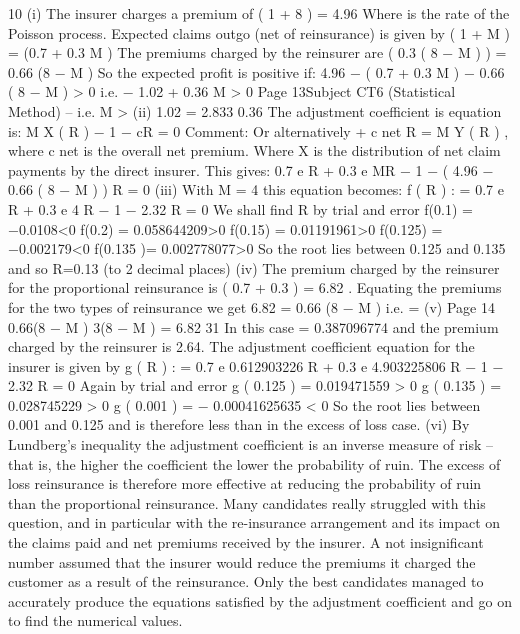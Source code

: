\documentclass[a4paper,12pt]{article}
\begin{document}
10
(i)
The insurer charges a premium of \lambda  \times  ( 1  + 8  )  = 4.96 \lambda 
Where \lambda  is the rate of the Poisson process. Expected claims outgo (net of
reinsurance) is given by \lambda  \times  ( 1  + M  ) = \lambda  (0.7 + 0.3 M )
The premiums charged by the reinsurer are
\lambda  \times  ( 0.3 \times  ( 8 − M )  ) = 0.66 \lambda  (8 − M )
So the expected profit is positive if:
4.96 \lambda  − \lambda  ( 0.7 + 0.3 M ) − 0.66 \lambda  ( 8 − M ) > 0
i.e.
− 1.02 + 0.36 M > 0
Page 13Subject CT6 (Statistical Method) – %
i.e.
M >
(ii)
1.02
= 2.833
0.36
The adjustment coefficient is equation is:
M X ( R ) − 1 − cR = 0
Comment: Or alternatively \lambda  + c net R = \lambda  M Y ( R ) , where c net is the overall net
premium.
Where X is the distribution of net claim payments by the direct insurer. This
gives:
0.7 e R + 0.3 e MR − 1 − ( 4.96 − 0.66 ( 8 − M ) ) R = 0
(iii)
With M = 4 this equation becomes:
f ( R ) : = 0.7 e R + 0.3 e 4 R − 1 − 2.32 R = 0
We shall find R by trial and error
f(0.1) = −0.0108<0
f(0.2) = 0.058644209>0
f(0.15) = 0.01191961>0
f(0.125) = −0.002179<0
f(0.135 )= 0.002778077>0
So the root lies between 0.125 and 0.135 and so R=0.13 (to 2 decimal places)
(iv)
The premium charged by the reinsurer for the proportional reinsurance is
\lambda  \times  \alpha  {} \times  ( 0.7 + 0.3  ) = 6.82 \alpha \lambda  .
Equating the premiums for the two types of reinsurance we get
6.82 \alpha \lambda  = 0.66 \lambda  (8 − M )
i.e.
\alpha =
(v)
Page 14
0.66(8 − M ) 3(8 − M )
=
6.82
31
In this case \alpha  = 0.387096774 and the premium charged by the reinsurer is
2.64\lambda  .%
The adjustment coefficient equation for the insurer is given by
g ( R ) : = 0.7 e 0.612903226 R + 0.3 e 4.903225806 R − 1 − 2.32 R = 0
Again by trial and error
g ( 0.125 ) = 0.019471559 > 0
g ( 0.135 ) = 0.028745229 > 0
g ( 0.001 ) = − 0.00041625635 < 0
So the root lies between 0.001 and 0.125 and is therefore less than in the
excess of loss case.
(vi)
By Lundberg’s inequality the adjustment coefficient is an inverse measure of risk – that is, the higher the coefficient the lower the probability of ruin. The
excess of loss reinsurance is therefore more effective at reducing the probability of ruin than the proportional reinsurance.
Many candidates really struggled with this question, and in particular with the re-insurance arrangement and its impact on the claims paid and net premiums received by the insurer. A
not insignificant number assumed that the insurer would reduce the premiums it charged the customer as a result of the reinsurance. Only the best candidates managed to accurately
produce the equations satisfied by the adjustment coefficient and go on to find the numerical values.
\end{document}
